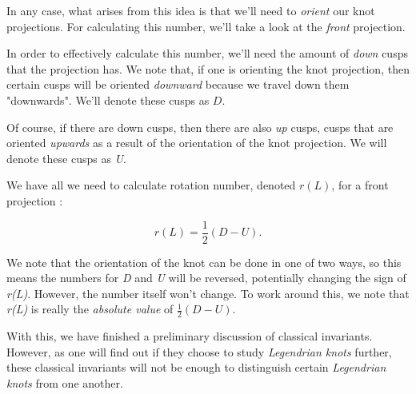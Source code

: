 \documentclass{article}
\begin{document}
In any case, what arises from this idea is that we'll need to \textit{orient} our knot projections.
For calculating this number, we'll take a look at the \textit{front} projection.

In order to effectively calculate this number, we'll need the amount of \textit{down} cusps
that the projection has. We note that, if one is orienting the knot projection, then certain
cusps will be oriented \textit{downward} because we travel down them "downwards". We'll denote
these cusps as $D$.

Of course, if there are down cusps, then there are also \textit{up} cusps, cusps that
are oriented \textit{upwards} as a result of the orientation of the knot projection. We will
denote these cusps as \textit{U}.

We have all we need to calculate rotation number, denoted $r(L)$, for
a front projection \cite{etnyre}:

\[r(L) = \frac{1}{2}(D - U).\]

We note that the orientation of the knot can be done in one of two ways,
so this means the numbers for \textit{D} and \textit{U} will be reversed,
potentially changing the sign of \textit{r(L)}. However, the number itself
won't change. To work around this, we note that \textit{r(L)} is really
the \textit{absolute value} of $\frac{1}{2}(D - U).$


With this, we have finished a preliminary discussion of classical invariants.
However, as one will find out if they choose to study \textit{Legendrian knots}
further, these classical invariants will not be enough to distinguish certain
\textit{Legendrian knots} from one another.




\end{document}
